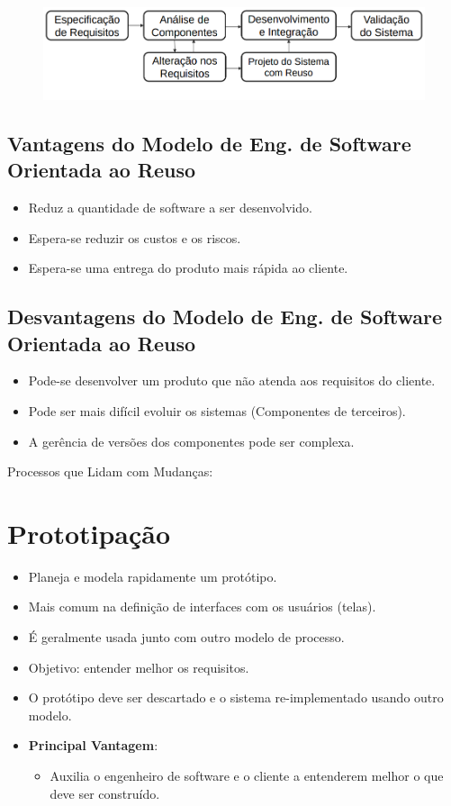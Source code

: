 \documentclass[a4paper, 11pt]{article}
\begin{document}
\begin{figure}[h]
    \includegraphics[width=14cm]{modelo_orientado_reuso}
    \centering
\end{figure}

\subsection{Vantagens do Modelo de Eng. de Software Orientada ao Reuso}
\begin{itemize}
    \item Reduz a quantidade de software a ser desenvolvido.
    \item Espera-se reduzir os custos e os riscos.
    \item Espera-se uma entrega do produto mais rápida ao cliente.
\end{itemize}

\subsection{Desvantagens do Modelo de Eng. de Software Orientada ao Reuso}
\begin{itemize}
    \item Pode-se desenvolver um produto que não atenda aos requisitos do cliente.
    \item Pode ser mais difícil evoluir os sistemas (Componentes de terceiros).
    \item A gerência de versões dos componentes pode ser complexa.
\end{itemize}
\newpage

Processos que Lidam com Mudanças:

\section{Prototipação}
\begin{itemize}
    \item Planeja e modela rapidamente um protótipo.
    \item Mais comum na definição de interfaces com os usuários (telas).
    \item É geralmente usada junto com outro modelo de processo.
    \item Objetivo: entender melhor os requisitos.
    \item O protótipo deve ser descartado e o sistema re-implementado usando outro modelo.
    \item \textbf{Principal Vantagem}:
    \begin{itemize}
        \item Auxilia o engenheiro de software e o cliente a entenderem melhor o que deve ser construído.
    \end{itemize} 
\end{itemize}
\end{document}
